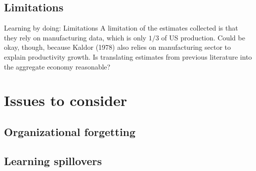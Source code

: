 \documentclass{beamer}
\begin{document}
\subsection{Limitations}

\begin{frame}{Learning by doing: Limitations}
    A limitation of the estimates collected is that they rely on manufacturing data, which is only $1/3$ of US production.
    \newline
    \newline
    Could be okay, though, because Kaldor (1978) also relies on manufacturing sector to explain productivity growth.
    \newline
    \newline
    Is translating estimates from previous literature into the aggregate economy reasonable?
\end{frame}

\section{Issues to consider}
\subsection{Organizational forgetting}
\subsection{Learning spillovers}
\end{document}
